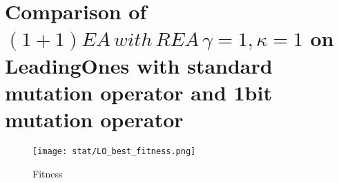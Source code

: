 \documentclass{article}
\begin{document}
\section{Comparison of $(1+1)EA\,with\,REA\,\gamma=1,\kappa=1$ on LeadingOnes with standard mutation operator and 1bit mutation operator}

\begin{figure}[H]
  \texttt{[image: stat/LO\_best\_fitness.png]}
  \caption{Fitness}
\end{figure}

%
\end{document}
